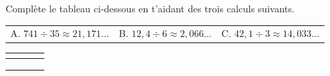 \documentclass[a4paper,10pt]{report}
\begin{document}
\begin{ex}
Complète le tableau ci-dessous en t'aidant des trois calculs suivants.
\begin{enumerate}
\renewcommand{\arraystretch}{0.5}
\begin{tabularx}{\linewidth}{*{3}{>{\arraybackslash}X}}
\item[A. ] $741 \div 35 \approx 21,171...$ &
\item[B. ] $12,4 \div 6 \approx 2,066... $ &
\item[C. ] $42,1 \div 3 \approx 14,033...$ \\
\end{tabularx}
\end{enumerate}

\begin{center}
\renewcommand{\arraystretch}{1.5}
\begin{tabularx}{\linewidth}{|p{0.5cm}|*{3}{>{\centering \arraybackslash}X|}}
\cline{2-4}
\multicolumn{1}{c|}{} & \cellcolor{exer1!20}{Arrondi à l'unité près} & \cellcolor{exer1!20}{Arrondi au dixième près} & \cellcolor{exer1!20}{Arrondi au centième près} \\\hline
\cellcolor{exer1!20}{A} & & & \\\hline
\cellcolor{exer1!20}{B} & & & \\\hline
\cellcolor{exer1!20}{C} & & & \\\hline
\end{tabularx}
\end{center}
\end{ex}
\end{document}
